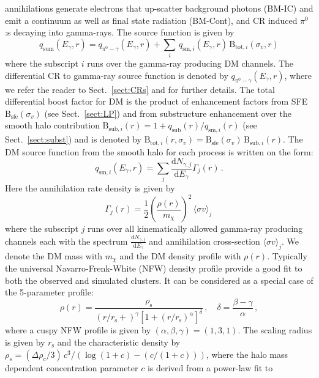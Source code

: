 \documentclass[10pt,aps,pra,reprint,amsmath,amsfonts,amssymb,showpacs]{revtex4-1}
\newcommand{\rmn}{\mathrm}
\newcommand{\sfe}{\rmn{sfe}}
\newcommand{\sub}{\rmn{sub}}
\newcommand{\s}{\rmn{s}}
\newcommand{\dd}{\rmn{d}}
\newcommand{\mx}{\ensuremath{m_{\chi}}}
\newcommand{\ngammaj}{\ensuremath{N_{\gamma,j}}}
\newcommand{\sigmaannv}{\ensuremath{\langle\sigma v\rangle}}
\newcommand{\sigv}{\ensuremath{\sigma_v}}
\newcommand{\egamma}{\ensuremath{E_{\gamma}}}
\newcommand{\rhos}{\ensuremath{\rho_s}}
\newcommand{\rhoc}{\ensuremath{\rho_c}}
\newcommand{\B}{\rmn{B}}
\newcommand{\eg}{E_\gamma}
\begin{document}
annihilations generate electrons that up-scatter background photons
(BM-IC) and emit a continuum as well as final state radiation
(BM-Cont), and CR induced $\pi^0$:s decaying into gamma-rays. The
source function is given by
\begin{equation}
q_\rmn{sum} (\eg,r) = q_{\pi^0-\gamma}(\eg,r)+
\sum_i \,q_{\rmn{sm},i}(\eg,r)\,\B_{\rmn{tot},i}(\sigv,r)
\end{equation}
where the subscript $i$ runs over the gamma-ray producing DM
channels. The differential CR to gamma-ray source function is denoted
by $q_{\pi^0-\gamma}(\eg,r)$, where we refer the reader to
Sect.~\ref{sect:CRs} and \cite{2010MNRAS.409..449P} for further
details. The total differential boost factor for DM is the product of
enhancement factors from SFE $\B_\sfe(\sigv)$ (see
Sect.~\ref{sect:LP}) and from substructure enhancement over the smooth
halo contribution $\B_{\sub,i}(r) = 1+q_\sub(r)/q_{\rmn{sm},i}(r)$
(see Sect.~\ref{sect:subst}) and is denoted by
$\B_{\rmn{tot},i}(r,\sigv) = \B_\sfe(\sigv)\,\B_{\sub,i}(r)$. The DM
source function from the smooth halo for each process is written on
the form:
\begin{equation}
\label{eq:q_sm}
q_{\rmn{sm},i} (\egamma,r) = \sum_j
\frac{\dd \ngammaj}{\dd E_\gamma} \Gamma_j(r)\,.
\end{equation}
Here the annihilation rate density is given by 
\begin{equation}
\label{eq:ann_rate}
\Gamma_j(r) = \frac{1}{2} \left(\frac{\rho(r)}{\mx}\right)^2 
\, \sigmaannv_j\,
\end{equation}
where the subscript $j$ runs over all kinematically allowed gamma-ray
producing channels each with the spectrum $\frac{\dd
  \ngammaj}{\dd\eg}$ and annihilation cross-section $\sigmaannv_j$. We
denote the DM mass with $\mx$ and the DM density profile with
$\rho(r)$. Typically the universal Navarro-Frenk-White (NFW) density
profile provide a good fit to both the observed and simulated
clusters. It can be considered as a special case of the 5-parameter profile:
\begin{equation}
\rho(r) = \frac{\rho_\s}{\left(r/r_\s+\right)^\gamma
  \left[1+\left(r/r_\s\right)^\alpha\right]^\delta}\,,\quad
\delta=\frac{\beta-\gamma}{\alpha}\,,
\label{eq:rho_nfw}
\end{equation}
where a cuspy NFW profile is given by
$(\alpha,\beta,\gamma)=(1,3,1)$. The scaling radius is given by $r_\s$
and the characteristic density by $\rhos=(\Delta\rhoc/3)\,
c^3/(\log(1+c)-(c/(1+c)))$, where the halo mass dependent
concentration parameter $c$ is derived from a power-law fit to
\end{document}
